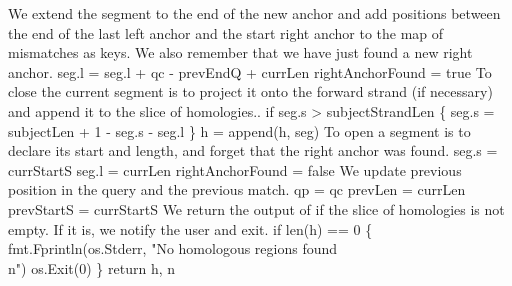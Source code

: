 \nwendcode{}\nwdocspar
We extend the segment to the end of the new anchor and add positions
between the end of the last left anchor and the start right anchor to
the map of mismatches as keys. We also remember that we have just
found a new right anchor.
\nwenddocs{}\endmoddef\nwstartdeflinemarkup{}\nwenddeflinemarkup
seg.l = seg.l + qc - prevEndQ + currLen
rightAnchorFound = true
\nwendcode{}\nwdocspar
To close the current segment is to project it onto the forward strand
(if necessary) and append it to the slice of homologies..
\nwenddocs{}\endmoddef\nwstartdeflinemarkup{}\nwenddeflinemarkup
if seg.s > subjectStrandLen \{
          seg.s = subjectLen + 1 - seg.s - seg.l
\}
h = append(h, seg)
\nwendcode{}\nwdocspar
To open a segment is to declare its start and length, and forget that
the right anchor was found.
\nwenddocs{}\endmoddef\nwstartdeflinemarkup{}\nwenddeflinemarkup
seg.s = currStartS
seg.l = currLen
rightAnchorFound = false
\nwendcode{}\nwdocspar
We update previous position in the query and the previous match.
\nwenddocs{}\endmoddef\nwstartdeflinemarkup{}\nwenddeflinemarkup
qp = qc
prevLen = currLen
prevStartS = currStartS
\nwendcode{}\nwdocspar
We return the output of  if the slice of
homologies is not empty. If it is, we notify the user and exit.
\nwenddocs{}\endmoddef\nwstartdeflinemarkup{}\nwenddeflinemarkup
if len(h) == 0 \{
          fmt.Fprintln(os.Stderr, "No homologous regions found\\n")
          os.Exit(0)
\}
return h, n
\nwendcode{}\nwdocspar
